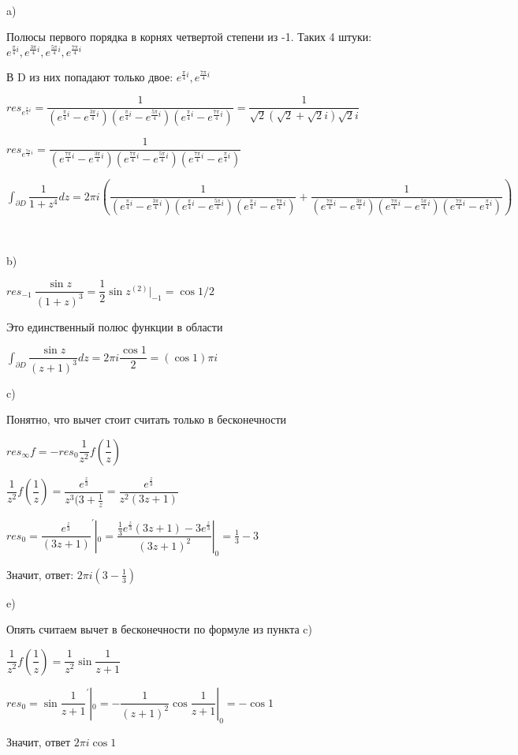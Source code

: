 ~\

\begin{solution}

a)


Полюсы первого порядка в корнях четвертой степени из -1. Таких 4 штуки: $e^{\frac{\pi}{4}i}, e^{\frac{3\pi}{4}i}, e^{\frac{5\pi}{4}i}, e^{\frac{7\pi}{4}i}$

В D из них попадают только двое: $e^{\frac{\pi}{4}i}, e^{\frac{7\pi}{4}i}$

$res_{e^{\frac{\pi}{4}i}} = \dfrac{1}{(e^{\frac{\pi}{4}i} - e^{\frac{3\pi}{4}i})(e^{\frac{\pi}{4}i} - e^{\frac{5\pi}{4}i})(e^{\frac{\pi}{4}i} - e^{\frac{7\pi}{4}i})} = \dfrac{1}{\sqrt{2}(\sqrt{2} + \sqrt{2}i)\sqrt{2}i}$

$res_{e^{\frac{7\pi}{4}i}} = \dfrac{1}{(e^{\frac{7\pi}{4}i} - e^{\frac{3\pi}{4}i})(e^{\frac{7\pi}{4}i} - e^{\frac{5\pi}{4}i})(e^{\frac{7\pi}{4}i} - e^{\frac{\pi}{4}i})}$

$\int_{\partial D}{\dfrac{1}{1 + z^4} dz} = 2 \pi i(\dfrac{1}{(e^{\frac{\pi}{4}i} - e^{\frac{3\pi}{4}i})(e^{\frac{\pi}{4}i} - e^{\frac{5\pi}{4}i})(e^{\frac{\pi}{4}i} - e^{\frac{7\pi}{4}i})} + \dfrac{1}{(e^{\frac{7\pi}{4}i} - e^{\frac{3\pi}{4}i})(e^{\frac{7\pi}{4}i} - e^{\frac{5\pi}{4}i})(e^{\frac{7\pi}{4}i} - e^{\frac{\pi}{4}i})})$

~\

b)

$res_{-1} \: \dfrac{\sin z}{(1 + z)^3} = \dfrac{1}{2} \sin{z}^{(2)}|_{-1} = \cos{1}/2$

Это единственный полюс функции в области

$\int_{\partial D}{\dfrac{\sin{z}}{(z + 1)^3} dz} = 2 \pi i \dfrac{\cos 1}{2} = (\cos 1) \pi i$

c)

Понятно, что вычет стоит считать только в бесконечности

$res_{\infty}f = - res_0\dfrac{1}{z^2}{f(\dfrac{1}{z})}$

$\dfrac{1}{z^2}{f(\dfrac{1}{z})} = \dfrac{e^{\frac{z}{3}}}{z^3(3 + \frac{1}{z}} = \dfrac{e^{\frac{z}{3}}}{z^2(3z + 1)}$

$res_0 = \dfrac{e^{\frac{z}{3}}}{(3z + 1)}^{\prime}|_0 = \dfrac{\frac{1}{3}e^{\frac{z}{3}}(3z + 1) - 3e^{\frac{z}{3}}}{(3z + 1)^2}|_0 = \frac{1}{3} - 3$

Значит, ответ: $2 \pi i(3 - \frac{1}{3})$

e)

Опять считаем вычет в бесконечности по формуле из пункта c)

$\dfrac{1}{z^2}{f(\dfrac{1}{z})} = \dfrac{1}{z^2} \sin{\dfrac{1}{z + 1}}$

$res_0 = \sin{\dfrac{1}{z + 1}}^\prime|_0 = -\dfrac{1}{(z + 1)^2}\cos{\dfrac{1}{z + 1}}|_0 = -\cos{1}$

Значит, ответ $2 \pi i \cos 1$


\end{solution}

